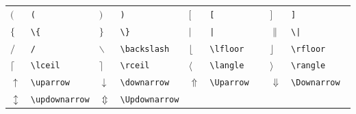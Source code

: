 \documentclass[fleqn]{icat-ufal}
\begin{document}
\begin{spacing}{1}
\begin{longtable}{p{3mm}p{28mm}p{3mm}p{28mm}p{3mm}p{28mm}p{3mm}p{28mm}} \hline
  $(           $ & \lstinline!(           ! & 
  $)           $ & \lstinline!)           ! &
  $[           $ & \lstinline![           ! & 
  $]           $ & \lstinline!]           ! \\
  $\{          $ & \lstinline!\{          ! &
  $\}          $ & \lstinline!\}          ! &
  $|           $ & \lstinline!|           ! &
  $\|          $ & \lstinline!\|          ! \\
  $/           $ & \lstinline!/           ! &
  $\backslash  $ & \lstinline!\backslash  ! &
  $\lfloor     $ & \lstinline!\lfloor     ! &
  $\rfloor     $ & \lstinline!\rfloor     ! \\
  $\lceil      $ & \lstinline!\lceil      ! &
  $\rceil      $ & \lstinline!\rceil      ! &
  $\langle     $ & \lstinline!\langle     ! &
  $\rangle     $ & \lstinline!\rangle     ! \\
  $\uparrow    $ & \lstinline!\uparrow    ! &
  $\downarrow  $ & \lstinline!\downarrow  ! &
  $\Uparrow    $ & \lstinline!\Uparrow    ! &
  $\Downarrow  $ & \lstinline!\Downarrow  ! \\
  $\updownarrow$ & \lstinline!\updownarrow! &
  $\Updownarrow$ & \lstinline!\Updownarrow! \\ \hline
\end{longtable}


\end{spacing}
\end{document}

